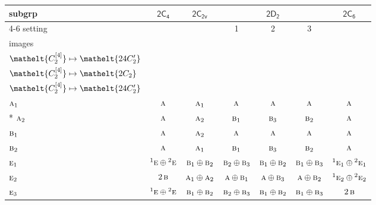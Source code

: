 \documentclass[10pt,a4paper]{article}
\numberwithin{equation}{section}
\newcommand{\eltfont}[1]{{\let\sigma\eltsigma\mathelt{#1}}}
\newcommand{\grp}[1]{\mathsf{#1}}
\newcommand{\irr}[1]{\text{\normalfont\scshape #1}}
\newcommand{\conjpair}[1]{{}^{#1}}
\newcommand{\cls}[1]{\eltfont{#1}}
\newcommand{\genidx}[2]{#1^{[\mathrm{#2}]}}
\begin{document}
{\small\begin{longtable}{@{}lcccccc@{}}\toprule
subgrp & \href{2C4.pdf}{$\grp{2C_{4}}$} & \href{2C2v.pdf}{$\grp{2C_{2v}}$} & \multicolumn{3}{c}{\href{2D2.pdf}{$\grp{2D_{2}}$}} & \href{2C6.pdf}{$\grp{2C_{6}}$}\\\cmidrule(lr){4-6}
setting &  &  & 1 & 2 & 3 & \\
images &  &  & {\scriptsize\begin{tabular}[t]{@{}c@{}}$\cls{\genidx{C_{2}}{2}} \mapsto \cls{2C_{2}}$\\$\cls{\genidx{C_{2}}{4}} \mapsto \cls{24C_{2}'}$\end{tabular}} & {\scriptsize\begin{tabular}[t]{@{}c@{}}$\cls{\genidx{C_{2}}{2}} \mapsto \cls{24C_{2}'}$\\$\cls{\genidx{C_{2}}{4}} \mapsto \cls{2C_{2}}$\end{tabular}} & {\scriptsize\begin{tabular}[t]{@{}c@{}}$\cls{\genidx{C_{2}}{2}} \mapsto \cls{24C_{2}'}$\\$\cls{\genidx{C_{2}}{4}} \mapsto \cls{24C_{2}'}$\end{tabular}} & \\\midrule\endhead
\bottomrule\endfoot\endlastfoot
$\irr{a}_{1}$ & $\irr{a}$ & $\irr{a}_{1}$ & $\irr{a}$ & $\irr{a}$ & $\irr{a}$ & $\irr{a}$\\*
$\irr{a}_{2}$ & $\irr{a}$ & $\irr{a}_{2}$ & $\irr{b}_{1}$ & $\irr{b}_{3}$ & $\irr{b}_{2}$ & $\irr{a}$\\
$\irr{b}_{1}$ & $\irr{a}$ & $\irr{a}_{2}$ & $\irr{a}$ & $\irr{a}$ & $\irr{a}$ & $\irr{a}$\\
$\irr{b}_{2}$ & $\irr{a}$ & $\irr{a}_{1}$ & $\irr{b}_{1}$ & $\irr{b}_{3}$ & $\irr{b}_{2}$ & $\irr{a}$\\
$\irr{e}_{1}$ & $\conjpair{1}\irr{e}\oplus \conjpair{2}\irr{e}$ & $\irr{b}_{1}\oplus \irr{b}_{2}$ & $\irr{b}_{2}\oplus \irr{b}_{3}$ & $\irr{b}_{1}\oplus \irr{b}_{2}$ & $\irr{b}_{1}\oplus \irr{b}_{3}$ & $\conjpair{1}\irr{e}_{1}\oplus \conjpair{2}\irr{e}_{1}$\\
$\irr{e}_{2}$ & $2\,\irr{b}$ & $\irr{a}_{1}\oplus \irr{a}_{2}$ & $\irr{a}\oplus \irr{b}_{1}$ & $\irr{a}\oplus \irr{b}_{3}$ & $\irr{a}\oplus \irr{b}_{2}$ & $\conjpair{1}\irr{e}_{2}\oplus \conjpair{2}\irr{e}_{2}$\\
$\irr{e}_{3}$ & $\conjpair{1}\irr{e}\oplus \conjpair{2}\irr{e}$ & $\irr{b}_{1}\oplus \irr{b}_{2}$ & $\irr{b}_{2}\oplus \irr{b}_{3}$ & $\irr{b}_{1}\oplus \irr{b}_{2}$ & $\irr{b}_{1}\oplus \irr{b}_{3}$ & $2\,\irr{b}$\\

\end{longtable}}
\end{document}
